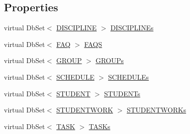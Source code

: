 \subsection*{Properties}
\begin{DoxyCompactItemize}
\item 
virtual Db\+Set$<$ \hyperlink{class_e_f_oracle_1_1_model_1_1_d_i_s_c_i_p_l_i_n_e}{D\+I\+S\+C\+I\+P\+L\+I\+NE} $>$ \hyperlink{class_e_f_oracle_1_1_model_1_1db_context_a877177066e29d595f2dddfe607221014}{D\+I\+S\+C\+I\+P\+L\+I\+N\+Es}
\item 
virtual Db\+Set$<$ \hyperlink{class_e_f_oracle_1_1_model_1_1_f_a_q}{F\+AQ} $>$ \hyperlink{class_e_f_oracle_1_1_model_1_1db_context_ae4d2109d575a8452d43c4a248b904ce9}{F\+A\+QS}
\item 
virtual Db\+Set$<$ \hyperlink{class_e_f_oracle_1_1_model_1_1_g_r_o_u_p}{G\+R\+O\+UP} $>$ \hyperlink{class_e_f_oracle_1_1_model_1_1db_context_ac3341236bedc98c90e78823a2445ec77}{G\+R\+O\+U\+Ps}
\item 
virtual Db\+Set$<$ \hyperlink{class_e_f_oracle_1_1_model_1_1_s_c_h_e_d_u_l_e}{S\+C\+H\+E\+D\+U\+LE} $>$ \hyperlink{class_e_f_oracle_1_1_model_1_1db_context_a8d28c1bcf1c322197797742fc19fb938}{S\+C\+H\+E\+D\+U\+L\+Es}
\item 
virtual Db\+Set$<$ \hyperlink{class_e_f_oracle_1_1_model_1_1_s_t_u_d_e_n_t}{S\+T\+U\+D\+E\+NT} $>$ \hyperlink{class_e_f_oracle_1_1_model_1_1db_context_abc478c89d374a1536023b302d463999b}{S\+T\+U\+D\+E\+N\+Ts}
\item 
virtual Db\+Set$<$ \hyperlink{class_e_f_oracle_1_1_model_1_1_s_t_u_d_e_n_t_w_o_r_k}{S\+T\+U\+D\+E\+N\+T\+W\+O\+RK} $>$ \hyperlink{class_e_f_oracle_1_1_model_1_1db_context_a20e83719134cb5ad1aacf084687d85f1}{S\+T\+U\+D\+E\+N\+T\+W\+O\+R\+Ks}
\item 
virtual Db\+Set$<$ \hyperlink{class_e_f_oracle_1_1_model_1_1_t_a_s_k}{T\+A\+SK} $>$ \hyperlink{class_e_f_oracle_1_1_model_1_1db_context_aba64e3846cf54d7d09086057e8049442}{T\+A\+S\+Ks}

\end{DoxyCompactItemize}
